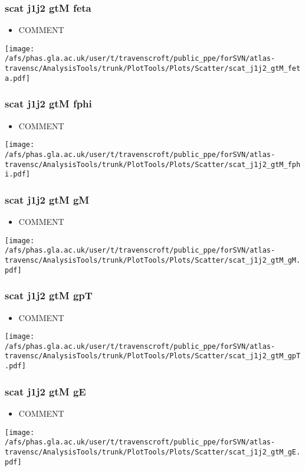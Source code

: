 \documentclass{beamer}
\begin{document}
\begin{frame}
\frametitle{scat j1j2 gtM feta}
\begin{itemize}
\item COMMENT
\end{itemize}
\begin{center}
\texttt{[image: /afs/phas.gla.ac.uk/user/t/travenscroft/public\_ppe/forSVN/atlas-travensc/AnalysisTools/trunk/PlotTools/Plots/Scatter/scat\_j1j2\_gtM\_feta.pdf]}
\end{center}
\end{frame}

\begin{frame}
\frametitle{scat j1j2 gtM fphi}
\begin{itemize}
\item COMMENT
\end{itemize}
\begin{center}
\texttt{[image: /afs/phas.gla.ac.uk/user/t/travenscroft/public\_ppe/forSVN/atlas-travensc/AnalysisTools/trunk/PlotTools/Plots/Scatter/scat\_j1j2\_gtM\_fphi.pdf]}
\end{center}
\end{frame}

\begin{frame}
\frametitle{scat j1j2 gtM gM}
\begin{itemize}
\item COMMENT
\end{itemize}
\begin{center}
\texttt{[image: /afs/phas.gla.ac.uk/user/t/travenscroft/public\_ppe/forSVN/atlas-travensc/AnalysisTools/trunk/PlotTools/Plots/Scatter/scat\_j1j2\_gtM\_gM.pdf]}
\end{center}
\end{frame}

\begin{frame}
\frametitle{scat j1j2 gtM gpT}
\begin{itemize}
\item COMMENT
\end{itemize}
\begin{center}
\texttt{[image: /afs/phas.gla.ac.uk/user/t/travenscroft/public\_ppe/forSVN/atlas-travensc/AnalysisTools/trunk/PlotTools/Plots/Scatter/scat\_j1j2\_gtM\_gpT.pdf]}
\end{center}
\end{frame}

\begin{frame}
\frametitle{scat j1j2 gtM gE}
\begin{itemize}
\item COMMENT
\end{itemize}
\begin{center}
\texttt{[image: /afs/phas.gla.ac.uk/user/t/travenscroft/public\_ppe/forSVN/atlas-travensc/AnalysisTools/trunk/PlotTools/Plots/Scatter/scat\_j1j2\_gtM\_gE.pdf]}
\end{center}
\end{frame}
\end{document}
